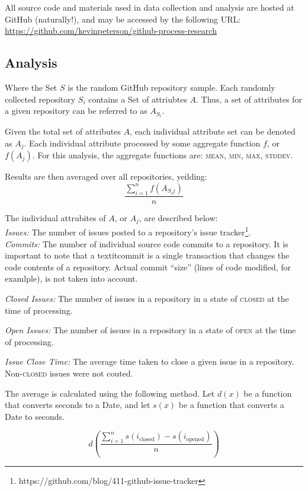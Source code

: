 \documentclass{proc}
\begin{document}
All source code and materials used in data collection and analysis are hosted at GitHub (naturally!), and may be accessed by the following URL: \url{https://github.com/kevinpeterson/github-process-research}

\subsection{Analysis}
Where the Set $S$ is the random GitHub repository sample. Each randomly collected repository $S_i$ contains a Set of attriubtes $A$. Thus, a set of attributes for a given repository can be referred to as $A_{S_i}$.

Given the total set of attributes $A$, each individual attribute set can be denoted as $A_j$. Each individual attribute processed by some aggregate function $f$, or $f(  A_j )$. For this analysis, the aggregate functions are: \textsc{mean}, \textsc{min}, \textsc{max}, \textsc{stddev}.

Results are then averaged over all repositories, yeilding:
\[ \frac{\sum\limits_{i=1}^{n} f(  A_{S{_i}j}  ) } {n} \]

The individual attrubites of $A$, or $A_j$, are described below:\\
\textit{Issues:}
The number of issues posted to a repository's issue tracker\footnote{https://github.com/blog/411-github-issue-tracker}.\\

\textit{Commits:}
The number of individual source code commits to a repository. It is important to note that a textit{commit} is a single transaction that changes the code contents of a repository. Actual commit ``size'' (lines of code modified, for examlple), is not taken into account.

\textit{Closed Issues:}
The number of issues in a repository in a state of \textsc{closed} at the time of processing.

\textit{Open Issues:}
The number of issues in a repository in a state of \textsc{open} at the time of processing.

\textit{Issue Close Time:}
The average time taken to close a given issue in a repository. Non-\textsc{closed} issues were not couted.

The average is calculated using the following method. Let $d(x)$ be a function that converts seconds to a Date, and let $s(x)$ be a function that converts a Date to seconds.

\[ d\left( \frac{\sum\limits_{i=1}^{n} s(i_{\textrm{closed}}) - s(i_{\textrm{opened}})  } {n} \right) \]
\end{document}
